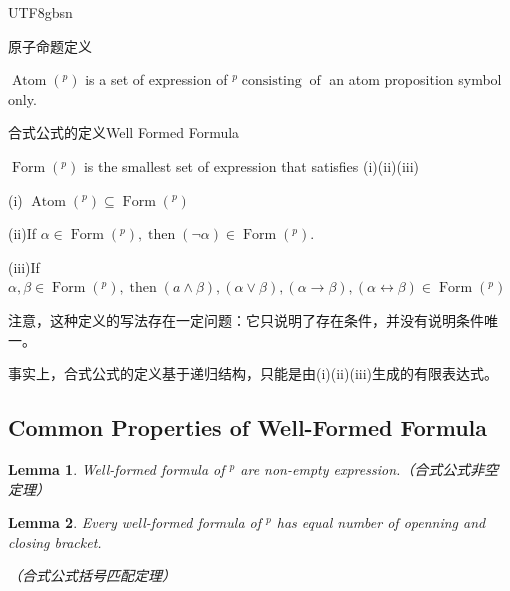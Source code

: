 \documentclass{article}
\newtheorem{lemma}{Lemma}
\newcommand{\nonconverted}[1]{\mbox{}}
\begin{document}
\begin{CJK*}{UTF8}{gbsn}
\begin{definition}
  原子命题定义
  
  $\ensuremath{\operatorname{Atom}} (\nonconverted{cal*L}^p)$ is a set of
  expression of $\nonconverted{cal*L}^p
  \ensuremath{\operatorname{consisting}}\ensuremath{\operatorname{of}}$ an
  atom proposition symbol only.
\end{definition}

\begin{definition}
  合式公式的定义Well Formed Formula
  
  $\ensuremath{\operatorname{Form}} (\nonconverted{cal*L}^p)$ is the smallest
  set of expression that satisfies (i)(ii)(iii)
  
  (i) $\ensuremath{\operatorname{Atom}} (\nonconverted{cal*L}^p) \subseteq
  \ensuremath{\operatorname{Form}} (\nonconverted{cal*L}^p)$
  
  (ii)If $\alpha \in \ensuremath{\operatorname{Form}}
  (\nonconverted{cal*L}^p), \ensuremath{\operatorname{then}} (\neg \alpha) \in
  \ensuremath{\operatorname{Form}} (\nonconverted{cal*L}^p) .$
  
  (iii)If $\alpha, \beta \in \ensuremath{\operatorname{Form}}
  (\nonconverted{cal*L}^p), \ensuremath{\operatorname{then}} (a \wedge \beta),
  (\alpha \vee \beta), (\alpha \rightarrow \beta), (\alpha \leftrightarrow
  \beta) \in \ensuremath{\operatorname{Form}} (\nonconverted{cal*L}^p)$
  
  注意，这种定义的写法存在一定问题：它只说明了存在条件，并没有说明条件唯一。
  
  事实上，合式公式的定义基于递归结构，只能是由(i)(ii)(iii)生成的有限表达式。
\end{definition}

\subsection{Common Properties of Well-Formed Formula}

\begin{lemma}
  Well-formed formula of $\nonconverted{cal*L}^p$ are non-empty
  expression.（合式公式非空定理）
\end{lemma}

\begin{lemma}
  Every well-formed formula of $\nonconverted{cal*L}^p$ has equal number of
  openning and closing bracket.
  
  （合式公式括号匹配定理）
\end{lemma}


\end{CJK*}
\end{document}
